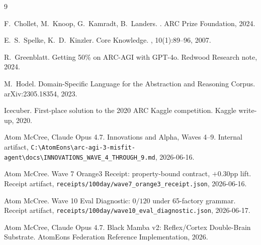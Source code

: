 \documentclass[11pt]{article}
\begin{document}
\begin{thebibliography}{9}

F.~Chollet, M.~Knoop, G.~Kamradt, B.~Landers.
.
\newblock ARC Prize Foundation, 2024.

E.~S.~Spelke, K.~D.~Kinzler.
\newblock Core Knowledge.
, 10(1):89--96, 2007.

R.~Greenblatt.
\newblock Getting 50\% on ARC-AGI with GPT-4o.
\newblock Redwood Research note, 2024.

M.~Hodel.
\newblock Domain-Specific Language for the Abstraction and Reasoning Corpus.
\newblock arXiv:2305.18354, 2023.

Icecuber.
\newblock First-place solution to the 2020 ARC Kaggle competition.
\newblock Kaggle write-up, 2020.


Atom McCree, Claude Opus 4.7.
\newblock Innovations and Alpha, Waves 4--9.
\newblock Internal artifact,
\texttt{C:\textbackslash AtomEons\textbackslash arc-agi-3-misfit-agent\textbackslash docs\textbackslash INNOVATIONS\_WAVE\_4\_THROUGH\_9.md},
2026-06-16.

Atom McCree.
\newblock Wave 7 Orange3 Receipt: property-bound contract, $+0.30$pp lift.
\newblock Receipt artifact,
\texttt{receipts/100day/wave7\_orange3\_receipt.json}, 2026-06-16.

Atom McCree.
\newblock Wave 10 Eval Diagnostic: $0/120$ under 65-factory grammar.
\newblock Receipt artifact,
\texttt{receipts/100day/wave10\_eval\_diagnostic.json}, 2026-06-17.

Atom McCree, Claude Opus 4.7.
\newblock Black Mamba v2: Reflex/Cortex Double-Brain Substrate.
\newblock AtomEons Federation Reference Implementation, 2026.

\end{thebibliography}
\end{document}
